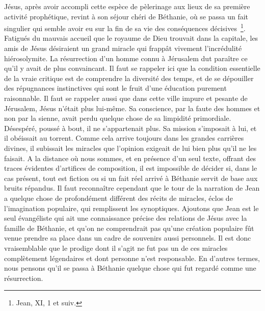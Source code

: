 \documentclass[french,twoside]{book} %
\begin{document}
Jésus, après avoir accompli cette espèce de pèlerinage aux lieux de sa première activité prophétique, revint à son séjour chéri de Béthanie, où se passa un fait singulier qui semble avoir eu sur la fin de sa vie des conséquences décisives \footnote{Jean, XI, 1 et suiv.}. Fatigués du mauvais accueil que le royaume de Dieu trouvait dans la capitale, les amis de Jésus désiraient un grand miracle qui frappât vivement l’incrédulité hiérosolymite. La résurrection d’un homme connu à Jérusalem dut paraître ce qu’il y avait de plus convaincant. Il faut se rappeler ici que la condition essentielle de la vraie critique est de comprendre la diversité des temps, et de se dépouiller des répugnances instinctives qui sont le fruit d’une éducation purement raisonnable. Il faut se rappeler aussi que dans cette ville impure et pesante de Jérusalem, Jésus n’était plus lui-même. Sa conscience, par la faute des hommes et non par la sienne, avait perdu quelque chose de sa limpidité primordiale. Désespéré, poussé à bout, il ne s’appartenait plus. Sa mission s’imposait à lui, et il obéissait au torrent. Comme cela arrive toujours dans les grandes carrières divines, il subissait les miracles que l’opinion exigeait de lui bien plus qu’il ne les faisait. A la distance où nous sommes, et en présence d’un seul texte, offrant des traces évidentes d’artifices de composition, il est impossible de décider si, dans le cas présent, tout est fiction ou si un fait réel arrivé à Béthanie servit de base aux bruits répandus. Il faut reconnaître cependant que le tour de la narration de Jean a quelque chose de profondément différent des récits de miracles, éclos de l’imagination populaire, qui remplissent les synoptiques. Ajoutons que Jean est le seul évangéliste qui ait une connaissance précise des relations de Jésus avec la famille de Béthanie, et qu’on ne comprendrait pas qu’une création populaire fût venue prendre sa place dans un cadre de souvenirs aussi personnels. Il est donc vraisemblable que le prodige dont il s’agit ne fut pas un de ces miracles complètement légendaires et dont personne n’est responsable. En d’autres termes, nous pensons qu’il se passa à Béthanie quelque chose qui fut regardé comme une résurrection.\par
\end{document}
